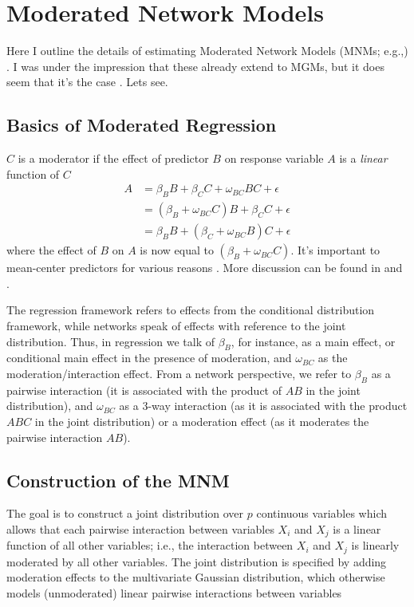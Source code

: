\section{Moderated Network Models}
Here I outline the details of estimating Moderated Network Models (MNMs; e.g.,) \cite{haslbeck2018moderated}. I was under the impression that these already extend to MGMs, but it does seem that it's the case \cite[33]{haslbeck2018moderated}. Lets see.

\subsection{Basics of Moderated Regression}
$C$ is a moderator if the effect of predictor $B$ on response variable $A$ is a \textit{linear} function of $C$
\begin{align} \label{linMod}
    A &= \beta_B B + \beta_C C + \omega_{BC} BC + \epsilon \\
    &= (\beta_B + \omega_{BC} C) B + \beta_C C + \epsilon \\
    &= \beta_B B + (\beta_C + \omega_{BC} B) C + \epsilon
\end{align}
where the effect of $B$ on $A$ is now equal to $(\beta_B + \omega_{BC} C)$. It's important to mean-center predictors for various reasons \cite[7]{haslbeck2018moderated}. More discussion can be found in \cite{aiken1991} and \cite{afshartous2011}.

The regression framework refers to effects from the conditional distribution framework, while networks speak of effects with reference to the joint distribution. Thus, in regression we talk of $\beta_B$, for instance, as a main effect, or conditional main effect in the presence of moderation, and $\omega_{BC}$ as the moderation/interaction effect. From a network perspective, we refer to $\beta_B$ as a pairwise interaction (it is associated with the product of $AB$ in the joint distribution), and $\omega_{BC}$ as a 3-way interaction (as it is associated with the product $ABC$ in the joint distribution) or a moderation effect (as it moderates the pairwise interaction $AB$). 

\subsection{Construction of the MNM}
The goal is to construct a joint distribution over $p$ continuous variables which allows that each pairwise interaction between variables $X_i$ and $X_j$ is a linear function of all other variables; i.e., the interaction between $X_i$ and $X_j$ is linearly moderated by all other variables. The joint distribution is specified by adding moderation effects to the multivariate Gaussian distribution, which otherwise models (unmoderated) linear pairwise interactions between variables

